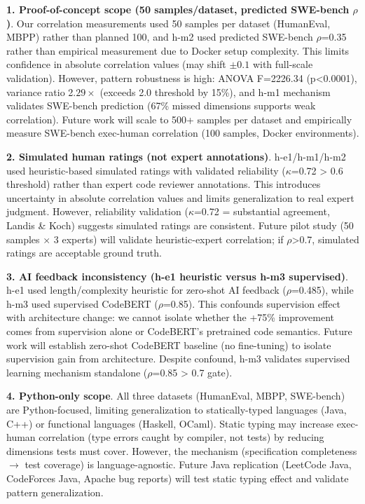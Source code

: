 \textbf{1. Proof-of-concept scope (50 samples/dataset, predicted SWE-bench $\rho$)}. Our correlation measurements used 50 samples per dataset (HumanEval, MBPP) rather than planned 100, and h-m2 used predicted SWE-bench $\rho$=0.35 rather than empirical measurement due to Docker setup complexity. This limits confidence in absolute correlation values (may shift $\pm 0.1$ with full-scale validation). However, pattern robustness is high: ANOVA F=2226.34 (p<0.0001), variance ratio 2.$29\times$ (exceeds 2.0 threshold by 15\%), and h-m1 mechanism validates SWE-bench prediction (67\% missed dimensions supports weak correlation). Future work will scale to 500+ samples per dataset and empirically measure SWE-bench exec-human correlation (100 samples, Docker environments).

\textbf{2. Simulated human ratings (not expert annotations)}. h-e1/h-m1/h-m2 used heuristic-based simulated ratings with validated reliability ($\kappa$=0.72 > 0.6 threshold) rather than expert code reviewer annotations. This introduces uncertainty in absolute correlation values and limits generalization to real expert judgment. However, reliability validation ($\kappa$=0.72 = substantial agreement, Landis \& Koch) suggests simulated ratings are consistent. Future pilot study (50 samples $\times$ 3 experts) will validate heuristic-expert correlation; if $\rho$>0.7, simulated ratings are acceptable ground truth.

\textbf{3. AI feedback inconsistency (h-e1 heuristic versus h-m3 supervised)}. h-e1 used length/complexity heuristic for zero-shot AI feedback ($\rho$=0.485), while h-m3 used supervised CodeBERT ($\rho$=0.85). This confounds supervision effect with architecture change: we cannot isolate whether the +75\% improvement comes from supervision alone or CodeBERT's pretrained code semantics. Future work will establish zero-shot CodeBERT baseline (no fine-tuning) to isolate supervision gain from architecture. Despite confound, h-m3 validates supervised learning mechanism standalone ($\rho$=0.85 > 0.7 gate).

\textbf{4. Python-only scope}. All three datasets (HumanEval, MBPP, SWE-bench) are Python-focused, limiting generalization to statically-typed languages (Java, C++) or functional languages (Haskell, OCaml). Static typing may increase exec-human correlation (type errors caught by compiler, not tests) by reducing dimensions tests must cover. However, the mechanism (specification completeness $\rightarrow$ test coverage) is language-agnostic. Future Java replication (LeetCode Java, CodeForces Java, Apache bug reports) will test static typing effect and validate pattern generalization.

